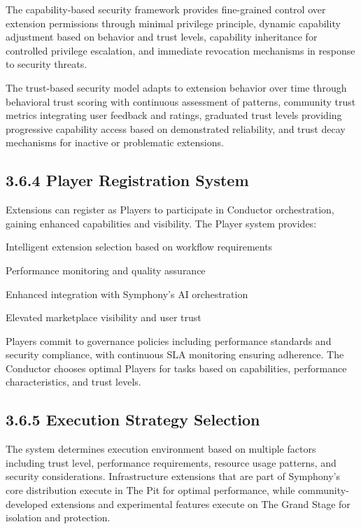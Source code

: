 The capability-based security framework provides fine-grained control over extension permissions through minimal privilege principle, dynamic capability adjustment based on behavior and trust levels, capability inheritance for controlled privilege escalation, and immediate revocation mechanisms in response to security threats.

The trust-based security model adapts to extension behavior over time through behavioral trust scoring with continuous assessment of patterns, community trust metrics integrating user feedback and ratings, graduated trust levels providing progressive capability access based on demonstrated reliability, and trust decay mechanisms for inactive or problematic extensions.

\subsection*{3.6.4 Player Registration System}

Extensions can register as Players to participate in Conductor orchestration, gaining enhanced capabilities and visibility. The Player system provides:

\begin{compactlist}
    \item Intelligent extension selection based on workflow requirements
    \item Performance monitoring and quality assurance
    \item Enhanced integration with Symphony's AI orchestration
    \item Elevated marketplace visibility and user trust
\end{compactlist}

Players commit to governance policies including performance standards and security compliance, with continuous SLA monitoring ensuring adherence. The Conductor chooses optimal Players for tasks based on capabilities, performance characteristics, and trust levels.

\subsection*{3.6.5 Execution Strategy Selection}

The system determines execution environment based on multiple factors including trust level, performance requirements, resource usage patterns, and security considerations. Infrastructure extensions that are part of Symphony's core distribution execute in The Pit for optimal performance, while community-developed extensions and experimental features execute on The Grand Stage for isolation and protection.
